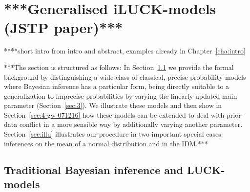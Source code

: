 \section{***Generalised iLUCK-models (JSTP paper)***}
\label{sec:jstp}

****short intro from intro and abstract, examples already in Chapter~\ref{cha:intro}


\medskip

***The section is structured as follows:
In Section~\ref{070517-sec2-1} we provide the formal background
by distinguishing a wide class of classical, precise probability models
where Bayesian inference has a particular form, being directly
suitable to a generalization to imprecise probabilities by varying
the linearly updated main parameter (Section~\ref{sec:3}).
We illustrate these models and then show in Section~\ref{sec:4-gw-071216}
how these models can be extended to deal with prior-data conflict in a more sensible way
by additionally varying another parameter.
Section~\ref{sec:illu} illustrates our procedure in two important special cases:
inferences on the mean of a normal distribution and in the IDM.***


\subsection{Traditional Bayesian inference and LUCK-models}\label{070517-sec2-1}

